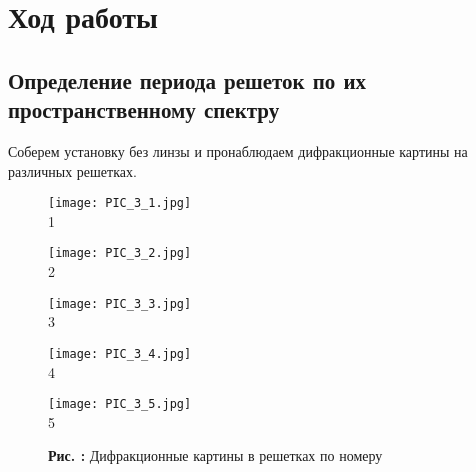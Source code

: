 \documentclass[12pt,a4paper]{article}
\newcounter{picture}
\begin{document}
	\section{Ход работы}
	
	\subsection{Определение периода решеток по их пространственному спектру}
	
	Соберем установку без линзы и пронаблюдаем дифракционные картины на различных решетках.
	
	\begin{figure}[h]
		\begin{minipage}{0.33\linewidth}
			\begin{center}
				\texttt{[image: PIC\_3\_1.jpg]}
				\\1
			\end{center}
		\end{minipage}
		\begin{minipage}{0.33\linewidth}
			\begin{center}
				\texttt{[image: PIC\_3\_2.jpg]}
				\\2
			\end{center}
		\end{minipage}
		\begin{minipage}{0.33\linewidth}
			\begin{center}
				\texttt{[image: PIC\_3\_3.jpg]}
				\\3
			\end{center}
		\end{minipage}
	\end{figure}
	\begin{figure}[h]
		\begin{minipage}{0.5\linewidth}
			\begin{center}
				\texttt{[image: PIC\_3\_4.jpg]}
				\\4
			\end{center}
		\end{minipage}
		\begin{minipage}{0.5\linewidth}
			\begin{center}
				\texttt{[image: PIC\_3\_5.jpg]}
				\\5
			\end{center}
		\end{minipage}
	\begin{center}
		\textbf{Рис. \thepicture:} Дифракционные картины в решетках по номеру
		\label{pic_\thepicture}
		\addtocounter{picture}{1}
	\end{center}
	\end{figure}
	
\end{document}
